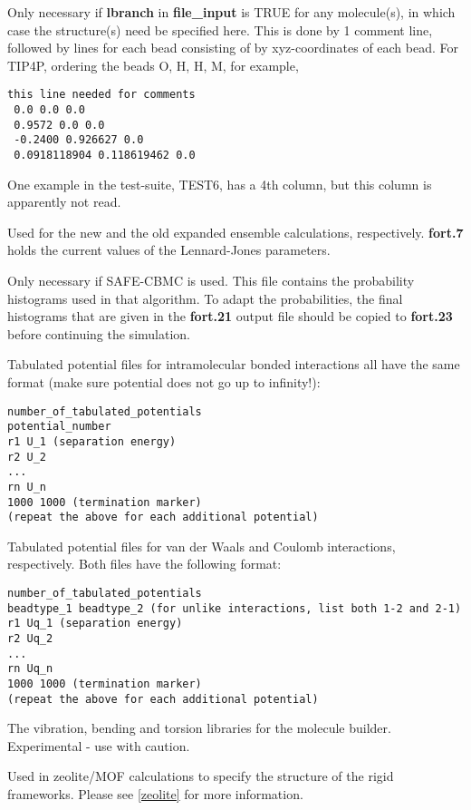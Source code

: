 \documentclass[12pt,letterpaper]{article}
\begin{document}
 Only necessary if {\bf lbranch}
in {\bf file\_input} is TRUE for any molecule(s), in which
case the structure(s) need be specified here. This is done
by 1 comment line, followed by lines for each bead consisting 
of by xyz-coordinates of each bead. For TIP4P, ordering the 
beads O, H, H, M, for example, 
\begin{verbatim}
this line needed for comments
 0.0 0.0 0.0
 0.9572 0.0 0.0
 -0.2400 0.926627 0.0
 0.0918118904 0.118619462 0.0
\end{verbatim}
One example in the test-suite, TEST6, has a 4th column, but
this column is apparently not read.


 Used for the new and the old
expanded ensemble calculations, respectively. {\bf fort.7}
holds the current values of the Lennard-Jones parameters.

 Only necessary if SAFE-CBMC is used.
This file contains the probability histograms used in that
algorithm. To adapt the probabilities, the final histograms
that are given in the {\bf fort.21} output file should be
copied to {\bf fort.23} before continuing the simulation.

 Tabulated potential
files for intramolecular bonded interactions all have the
same format (make sure potential does not go up to
infinity!):
\begin{verbatim}
number_of_tabulated_potentials
potential_number
r1 U_1 (separation energy)
r2 U_2
...
rn U_n
1000 1000 (termination marker)
(repeat the above for each additional potential)
\end{verbatim}

 Tabulated potential files
for van der Waals and Coulomb interactions, respectively.
Both files have the following format:
\begin{verbatim}
number_of_tabulated_potentials
beadtype_1 beadtype_2 (for unlike interactions, list both 1-2 and 2-1)
r1 Uq_1 (separation energy)
r2 Uq_2
...
rn Uq_n
1000 1000 (termination marker)
(repeat the above for each additional potential)
\end{verbatim}

 The vibration,
bending and torsion libraries for the molecule builder.
Experimental - use with caution.

 Used
in zeolite/MOF calculations to specify the structure of the
rigid frameworks. Please see \ref{zeolite} for more
information.
\end{document}
